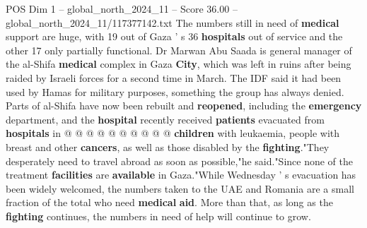 \begin{textsample}{POS Dim 1 – global\_north\_2024\_11 – Score 36.00 – global\_north\_2024\_11/117377142.txt}
The numbers still in need of \textbf{medical} support are huge, with 19 out of Gaza ' s 36 \textbf{hospitals} out of service and the other 17 only partially functional.
Dr Marwan Abu Saada is general manager of the al-Shifa \textbf{medical} complex in Gaza \textbf{City}, which was left in ruins after being raided by Israeli forces for a second time in March.
The IDF said it had been used by Hamas for military purposes, something the group has always denied.
Parts of al-Shifa have now been rebuilt and \textbf{reopened}, including the \textbf{emergency} department, and the \textbf{hospital} recently received \textbf{patients} evacuated from \textbf{hospitals} in @ @ @ @ @ @ @ @ @ @ \textbf{children} with leukaemia, people with breast and other \textbf{cancers}, as well as those disabled by the \textbf{fighting}."They desperately need to travel abroad as soon as possible,"he said."Since none of the treatment \textbf{facilities} are \textbf{available} in Gaza."While Wednesday ' s evacuation has been widely welcomed, the numbers taken to the UAE and Romania are a small fraction of the total who need \textbf{medical} \textbf{aid}.
More than that, as long as the \textbf{fighting} continues, the numbers in need of help will continue to grow.

\end{textsample}
